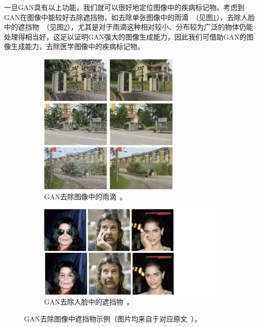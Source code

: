 \noindent 一旦GAN具有以上功能，我们就可以很好地定位图像中的疾病标记物。考虑到GAN在图像中能较好去除遮挡物，如去除单张图像中的雨滴~\cite{qian2018attentive}（见图\ref{subfig:attention_gan}），去除人脸中的遮挡物~\cite{yuan2019face}（见图\ref{subfig:face_de_occulusion}），尤其是对于雨滴这种相对较小、分布较为广泛的物体仍能处理得相当好，这足以证明GAN强大的图像生成能力，因此我们可借助GAN的图像生成能力，去除医学图像中的疾病标记物。
\begin{figure}[h!]
	\begin{subfigure}{0.45\textwidth}
		\centering
		\includegraphics[width=0.75\textwidth]{figure/attention_gan_example.png}
		\caption{GAN去除图像中的雨滴~\cite{qian2018attentive}。}
		\label{subfig:attention_gan}
	\end{subfigure}
	\begin{subfigure}{0.45\textwidth}
		\centering
		\includegraphics[width=1.5\textwidth]{figure/face_de_occulusion.png}
		\caption{GAN去除人脸中的遮挡物~\cite{yuan2019face}。}
		\label{subfig:face_de_occulusion}
	\end{subfigure}
	\caption[GAN去除图像中遮挡物示例]{GAN去除图像中遮挡物示例（图片均来自于对应原文~\cite{qian2018attentive,yuan2019face}）。}
	\label{mul_fig:gan_auto_encoder_example}
\end{figure}
